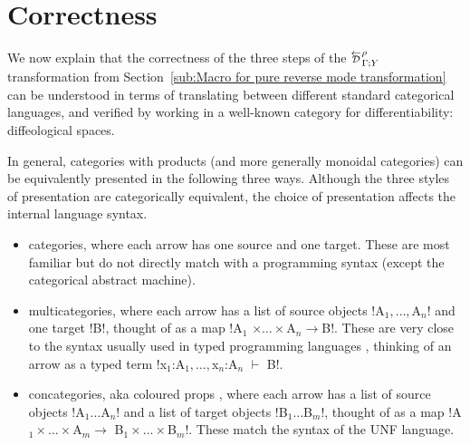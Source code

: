 \section{Correctness}
\label{sec:correctness}

We now explain that the correctness of the three steps of the $\directD{\rho}{\Gamma}{Y}$ transformation from Section~\ref{sub:Macro for pure reverse mode transformation} can be understood in terms of translating between different standard categorical languages, 
and verified by working in a well-known category for differentiability: diffeological spaces. 

In general, categories with products (and more generally monoidal categories) can be equivalently presented in the following three ways. 
Although the three styles of presentation are categorically equivalent, the choice of presentation affects the internal language syntax.
\begin{itemize}
    \item categories, where each arrow has one source and one target. These are most familiar but do not directly match with a programming syntax (except the categorical abstract machine). 
    \item multicategories, where each arrow has a list of source objects !A$_1,\ldots,$A$_n$! and one target !B!, thought of as a map !A$_1$ $\times\ldots\times$A$_n\to$B!. 
    These are very close to the syntax usually used in typed programming languages \cite{lambek1968deductive,staton2013universal}, 
    thinking of an arrow as a typed term !x$_1$:A$_1,\ldots,$x$_n$:A$_n$ $\vdash$ B!.
    \item concategories, aka coloured props \cite{bonchi2015full,fong2019backprop}, where each arrow has a list of source objects !A$_1\ldots$A$_n$! and a list of target objects !B$_1\ldots$B$_m$!, thought of as a map !A$_1\times\ldots\times$A$_m \to$ B$_1\times\ldots\times$B$_m$!. These match the syntax of the UNF language.
\end{itemize}

